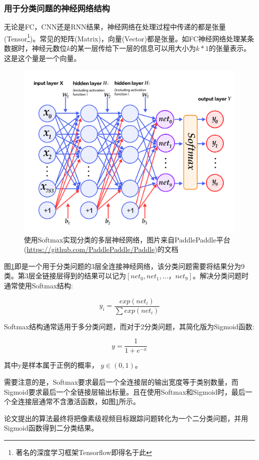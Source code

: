 \subsubsection{用于分类问题的神经网络结构}
\par
无论是FC，CNN还是RNN结果，神经网络在处理过程中传递的都是张量(Tensor\footnote{著名的深度学习框架Tensorflow\supercite{abadi2016tensorflow}即得名于此})。常见的矩阵(Matrix)，向量(Vector)都是张量。如FC神经网络处理某条数据时，神经元数位$k$的某一层传给下一层的信息可以用大小为$k*1$的张量表示。这是这个量是一个向量。
\par
\begin{figure}[htbp!]
    \centering
    \includegraphics[width = 1.\textwidth]{chap/img/mlp_paddle.png}
    \caption{
        使用Softmax实现分类的多层神经网络，图片来自PaddlePaddle平台(\url{https://github.com/PaddlePaddle/Paddle})的文档\supercite{recognize_digits_paddle}
        }\label{fig:mlp_paddle}
\end{figure}
\par
图\ref{fig:mlp_paddle}即是一个用于分类问题的3层全连接神经网络，该分类问题需要将结果分为9类。第3层全链接层得到的结果可以记为$[net_0,net_1,...，net_9]$。解决分类问题时通常使用Softmax结构:
\par
\begin{equation} y_i = \frac{exp(net_i)}{\sum{ exp(net_i) }}  \end{equation}
\par
Softmax结构通常适用于多分类问题，而对于2分类问题，其简化版为Sigmoid函数:
\par
\begin{equation} y = \frac{1}{1+e^{-x}}  \end{equation}
\par
其中y是样本属于正例的概率， $y\in (0,1)$。
\par
需要注意的是，Softmax要求最后一个全连接层的输出宽度等于类别数量，而Sigmoid要求最后一个全链接层输出标量。且在使用Softmax和Sigmoid时，最后一个全连接层通常不含激活函数，如图\ref{fig:mlp_paddle}所示。
\par
论文提出的算法最终将把像素级视频目标跟踪问题转化为一个二分类问题，并用Sigmoid函数得到二分类结果。

